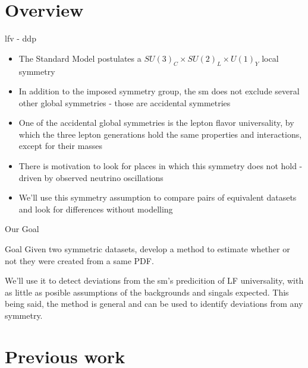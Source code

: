 \documentclass[notheorems]{beamer}
\begin{document}
\section{Overview}

\begin{frame}{\gls{lfv} - \gls{ddp}}
    \begin{itemize}
        \item The Standard Model postulates a $SU(3)_C \times SU(2)_L \times U(1)_Y$ local symmetry
        \item In addition to the imposed symmetry group, the \gls{sm} does not exclude several other global symmetries - those are accidental symmetries
        \item One of the accidental global symmetries is the lepton flavor universality, by which the three lepton generations hold the same properties and interactions, except for their masses
        \item There is motivation to look for places in which this symmetry does not hold - driven by observed neutrino oscillations
        \item We'll use this symmetry assumption to compare pairs of equivalent datasets and look for differences without modelling
    \end{itemize}
\end{frame}

\begin{frame}{Our Goal}
    \begin{block}{Goal}
        Given two symmetric datasets, develop a method to estimate whether or not they were created from a same PDF.
        \vspace{0.5cm}

        We'll use it to detect deviations from the \gls{sm}'s predicition of LF universality, with as little as posible assumptions of the backgrounds and singals expected.
        This being said, the method is general and can be used to identify deviations from any symmetry.
    \end{block}
\end{frame}

\section{Previous work}
\end{document}
